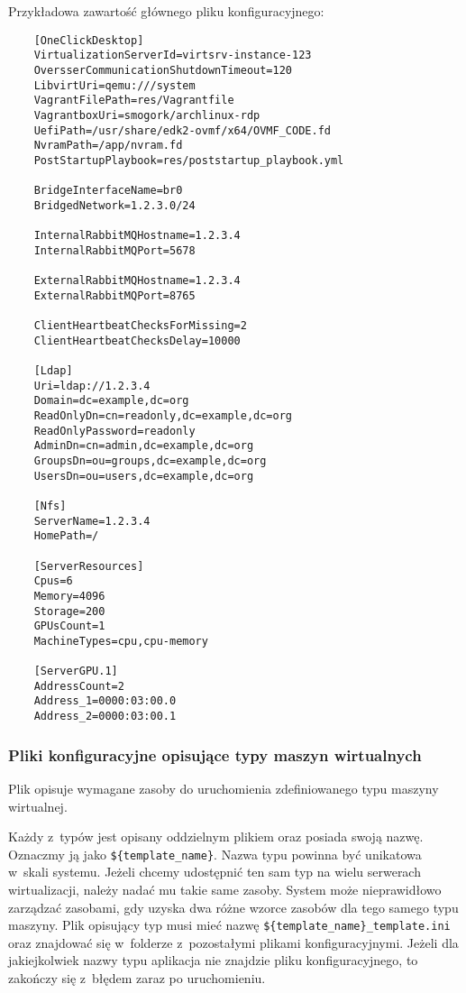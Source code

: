\documentclass[../opis-rozwiazania.tex]{subfiles}
\begin{document}
Przykładowa zawartość głównego pliku konfiguracyjnego:
\begin{verbatim}
	[OneClickDesktop]
	VirtualizationServerId=virtsrv-instance-123
	OversserCommunicationShutdownTimeout=120
	LibvirtUri=qemu:///system
	VagrantFilePath=res/Vagrantfile
	VagrantboxUri=smogork/archlinux-rdp
	UefiPath=/usr/share/edk2-ovmf/x64/OVMF_CODE.fd
	NvramPath=/app/nvram.fd
	PostStartupPlaybook=res/poststartup_playbook.yml

	BridgeInterfaceName=br0
	BridgedNetwork=1.2.3.0/24

	InternalRabbitMQHostname=1.2.3.4
	InternalRabbitMQPort=5678

	ExternalRabbitMQHostname=1.2.3.4
	ExternalRabbitMQPort=8765

	ClientHeartbeatChecksForMissing=2
	ClientHeartbeatChecksDelay=10000

	[Ldap]
	Uri=ldap://1.2.3.4
	Domain=dc=example,dc=org
	ReadOnlyDn=cn=readonly,dc=example,dc=org
	ReadOnlyPassword=readonly
	AdminDn=cn=admin,dc=example,dc=org
	GroupsDn=ou=groups,dc=example,dc=org
	UsersDn=ou=users,dc=example,dc=org

	[Nfs]
	ServerName=1.2.3.4
	HomePath=/

	[ServerResources]
	Cpus=6
	Memory=4096
	Storage=200
	GPUsCount=1
	MachineTypes=cpu,cpu-memory

	[ServerGPU.1]
	AddressCount=2
	Address_1=0000:03:00.0
	Address_2=0000:03:00.1
\end{verbatim}

\subsubsection{Pliki konfiguracyjne opisujące typy maszyn wirtualnych}
Plik opisuje wymagane zasoby do uruchomienia zdefiniowanego typu maszyny wirtualnej.

Każdy z~typów jest opisany oddzielnym plikiem oraz posiada swoją nazwę.
Oznaczmy ją jako \texttt{\$\{template\_name\}}.
Nazwa typu powinna być unikatowa w~skali systemu.
Jeżeli chcemy udostępnić ten sam typ na wielu serwerach wirtualizacji, należy nadać mu takie same zasoby.
System może nieprawidłowo zarządzać zasobami, gdy uzyska dwa różne wzorce zasobów dla tego samego typu maszyny.
Plik opisujący typ musi mieć nazwę \texttt{\$\{template\_name\}\_template.ini} oraz znajdować się w~folderze z~pozostałymi plikami konfiguracyjnymi.
Jeżeli dla jakiejkolwiek nazwy typu aplikacja nie znajdzie pliku konfiguracyjnego, to zakończy się z~błędem zaraz po uruchomieniu.
\end{document}
